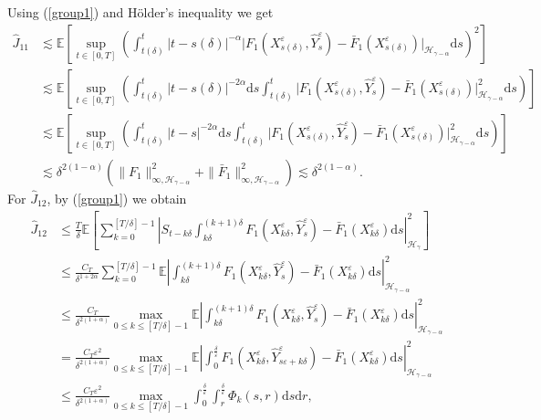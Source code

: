 \documentclass[10pt,a4paper]{article}
\numberwithin{equation}{section}
\begin{document}
Using (\ref{group1}) and H\"{o}lder's inequality we get
\begin{align}\label{hatJ11}
\hat{J}_{11}& \lesssim 	\mathbb E \left[ \sup_{t \in [0,T]} \left( \int_{t(\delta)}^t  |t-s(\delta)|^{-\alpha} \big|F_1(X_{s(\delta)}^\varepsilon,\hat{Y}_s^\varepsilon)-\bar{F}_1(X_{s(\delta)}^\varepsilon) \big|_{\mathcal H_{\gamma-\alpha} } \mathrm{d} s  \right)^2 \right]	\nonumber\\
& \lesssim \mathbb E \left[ \sup_{t \in [0,T]} \left( \int_{t(\delta)}^t |t-s(\delta)|^{-2\alpha} \mathrm{d} s  \int_{t(\delta)}^t  \big| F_1(X_{s(\delta)}^\varepsilon,\hat{Y}_s^\varepsilon)-\bar{F}_1(X_{s(\delta)}^\varepsilon) \big|_{\mathcal H_{\gamma-\alpha} }^2 \mathrm{d} s \right)  \right]	\nonumber\\
& \lesssim \mathbb E \left[ \sup_{t \in [0,T]} \left( \int_{t(\delta)}^t |t-s|^{-2\alpha} \mathrm{d} s  \int_{t(\delta)}^t  \big| F_1(X_{s(\delta)}^\varepsilon,\hat{Y}_s^\varepsilon)-\bar{F}_1(X_{s(\delta)}^\varepsilon) \big|_{\mathcal H_{\gamma-\alpha} }^2 \mathrm{d} s \right)  \right]	\nonumber\\
& \lesssim \delta^{2(1-\alpha)} \left( \|F_1\|_{\infty, \mathcal H_{\gamma-\alpha}}^2+ \|\bar{F}_1\|_{\infty, \mathcal H_{\gamma-\alpha}}^2 \right)
\lesssim \delta^{2(1-\alpha)}.
\end{align}
For $\hat{J}_{12}$, by (\ref{group1}) we obtain
\begin{align}\label{hatJ12}
\hat{J}_{12}& \leq  \frac T\delta	\mathbb E \left[ \sum_{k=0}^{[T/\delta]-1}  \left|S_{t-k\delta}  \int_{k\delta}^{(k+1)\delta}  F_1(X_{k\delta}^\varepsilon,\hat{Y}_s^\varepsilon)-\bar{F}_1(X_{k\delta}^\varepsilon)   \mathrm{d} s  \right|_{\mathcal H_{\gamma} }^2 \right] \nonumber\\
& \leq  \frac {C_T} {\delta^{1+2\alpha}} \sum_{k=0}^{[T/\delta]-1} \mathbb E  \left| \int_{k\delta}^{(k+1)\delta}  F_1(X_{k\delta}^\varepsilon,\hat{Y}_s^\varepsilon)-\bar{F}_1(X_{k\delta}^\varepsilon)   \mathrm{d} s   \right|_{\mathcal H_{\gamma-\alpha} }^2  \nonumber\\
& \leq  \frac {C_T} {\delta^{2(1+\alpha)}}  \max_{0\leq k\leq[T/\delta]-1} \mathbb E  \left| \int_{k\delta}^{(k+1)\delta}  F_1(X_{k\delta}^\varepsilon,\hat{Y}_s^\varepsilon)-\bar{F}_1(X_{k\delta}^\varepsilon)   \mathrm{d} s   \right|_{\mathcal H_{\gamma-\alpha} }^2  \nonumber\\
&= \frac {C_T \varepsilon^2} {\delta^{2(1+\alpha)}}  \max_{0\leq k\leq[T/\delta]-1} \mathbb E  \left| \int_0^{\frac \delta \varepsilon}  F_1(X_{k\delta}^\varepsilon,\hat{Y}_{s\varepsilon+k\delta}^\varepsilon)-\bar{F}_1(X_{k\delta}^\varepsilon)   \mathrm{d} s   \right|_{\mathcal H_{\gamma-\alpha} }^2  \nonumber\\
& \leq \frac {C_T \varepsilon^2} {\delta^{2(1+\alpha)}}  \max_{0\leq k\leq[T/\delta]-1} \int_0^{\frac \delta \varepsilon} \int_r^{\frac \delta \varepsilon} \Phi_k(s,r) \mathrm{d} s \mathrm{d} r,
\end{align}
\end{document}
